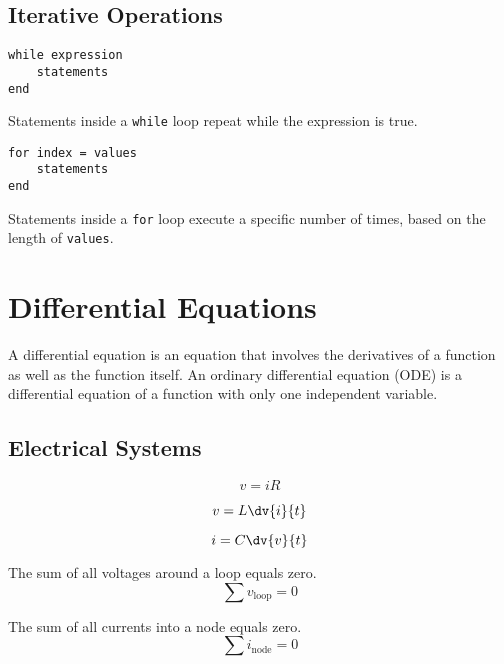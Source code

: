 \documentclass{article}
\begin{document}
\subsection{Iterative Operations}
\begin{multicols}{2}
    \begin{lstlisting}
while expression
    statements
end
    \end{lstlisting}
    \columnbreak
    Statements inside a \lstinline{while} loop repeat while the expression is true.
\end{multicols}
\begin{multicols}{2}
    \begin{lstlisting}
for index = values
    statements
end
    \end{lstlisting}
    \columnbreak
    Statements inside a \lstinline{for} loop execute a specific number of times, based on the length of \lstinline{values}.
\end{multicols}
\section{Differential Equations}
\begin{definition}
    A differential equation is an equation that involves the derivatives of a function as well as the function itself.
    An ordinary differential equation (ODE) is a differential equation of a function with only one independent variable.
\end{definition}
\subsection{Electrical Systems}
\begin{theorem}
    \begin{equation*}
        v = i R
    \end{equation*}
\end{theorem}
\begin{theorem}
    \begin{equation*}
        v = L \dv{i}{t}
    \end{equation*}
\end{theorem}
\begin{theorem}
    \begin{equation*}
        i = C \dv{v}{t}
    \end{equation*}
\end{theorem}
\begin{theorem}
    The sum of all voltages around a loop equals zero.
    \begin{equation*}
        \sum v_{\mathrm{loop}} = 0
    \end{equation*}
\end{theorem}
\begin{theorem}
    The sum of all currents into a node equals zero.
    \begin{equation*}
        \sum i_{\mathrm{node}} = 0
    \end{equation*}
\end{theorem}
\end{document}
